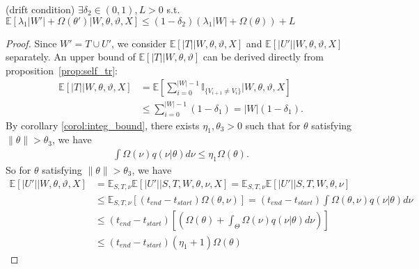 \begin{lemma}(drift condition) $\exists \delta_2 \in (0, 1), L > 0$
  s.t.
  $\mathbb{E}\left[\lambda_1|W'| + \Omega(\theta')  | W, \theta, \vartheta, X\right]
  \leq (1 - \delta_2)\left(\lambda_1|W| + \Omega(\theta)   \right) + L$ %
\label{lem:drift}
\end{lemma}
\begin{proof}
Since $W'=T\cup U'$, we consider $\mathbb{E}[|T| |W,\theta,\vartheta,X]$
and $\mathbb{E}[|U'| | W, \theta, \vartheta, X]$ separately.
An upper bound of $\mathbb{E}[|T| | W,\theta,\vartheta]$ can be derived
directly from proposition~\ref{prop:self_tr}:
\begin{align*}
\mathbb{E}[|T| |W,\theta,\vartheta,X] &= \mathbb{E}[\sum_{i = 0}^{|W|-1}
  \mathbb{I}_{\{ V_{i + 1} \neq V_i \}}| W, \theta, \vartheta, X]\\
&\leq \sum_{i = 0}^{|W| - 1} (1 - \delta_1) = |W|(1 - \delta_1).
\end{align*}
By corollary \ref{corol:integ_bound}, there exists $\eta_1 , \theta_3 > 0$ such that for $\theta$  satisfying $ \| \theta \| > \theta_3$, we have
\begin{align*}
\int \Omega(\nu) q(\nu | \theta)d\nu \leq \eta_1 \Omega(\theta).
\end{align*}
So for $\theta$ satisfying $ \| \theta \| > \theta_3$, we have
\begin{align*}
\mathbb{E}[|U'| |W, \theta, \vartheta, X] &= \mathbb{E}_{S,T, \nu}\mathbb{E}[|U'| | S, T, W, \theta, \nu, X] = \mathbb{E}_{S,T, \nu}\mathbb{E}[|U'| | S, T, W, \theta, \nu] \\
& \leq \mathbb{E}_{S,T, \nu} \left[(t_{end} - t_{start})\Omega(\theta, \nu)\right] = (t_{end} - t_{start})\int \Omega(\theta, \nu) q(\nu | \theta) d\nu\\
& \leq (t_{end} - t_{start})\left[ \left(  \Omega(\theta) +
\int_\Theta \Omega(\nu) q(\nu | \theta)d\nu \right) \right] \\
& \leq (t_{end} - t_{start}) (\eta_1 + 1) \Omega(\theta) %
\end{align*}



\end{proof}
